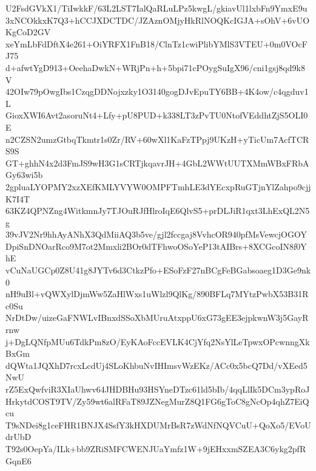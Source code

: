 U2FsdGVkX1/TiIwkkF/63L2LST7IalQaRLuLPz5kwgL/gkiavUl1lxbFn9YmxE9u
3xNCOkkxK7Q3+hCCJXDCTDC/JZAznOMjyHkRlNOQKcIGJA+sOhV+6vUOKgCoD2GV
xeYmLbFdDftX4e261+OiYRFX1FnB18/ClnTz1cwiPlibYMlS3VTEU+0m0VOcFJ75
d+afwtYgD913+OeehaDwkN+WRjPn+h+5bpi71cPOygSuIgX96/cni1gsj8qd9k8V
42OIw79pOwgIbs1CzqgDDNojxzky1O3140gogDJvEpuTY6BB+4K4ow/c4qgduv1L
GioxXWI6Avt2asoruNt4+Lfy+pU8PUD+k338LT3zPvTU0NtofVEddhtZjS5OLI0E
n2CZSN2umzGtbqTkmtr1s0Zr/RV+60wXl1KaFzTPpj9UKzH+yTicUm7AcfTCRS9S
GT+ghhN4x2d3FmJS9wH3G1sCRTjkqavrJH+4GbL2WWtUUTXMmWBxFRbAGy63wi5b
2gpluaLYOPMY2xzXEfKMLYVYW0OMPFTmhLE3dYEcxpRuGTjnYlZahpo9cjjK7I4T
63KZ4QPNZng4WitkmnJy7TJOuRJfHlroIqE6QlvS5+prDLJiR1qxt3LhExQL2N5g
39vJV2Nr9hhAyANhX3QdMiiAQ3b5ve/gjl2fccgaj8VvhcOR940pfMsVewcjOGOY
DpiSnDNOarRco9M7ot2Mmxli2BOr0dTFhwoOSoYeP13tAIBrs+8XCGcoIN8f0YhE
vCuNaUGCp0Z8U41g8JYTv6d3CtkzPfo+ESoFzF27nBCgFeBGabsoaeg1D3Ge9nk0
nH9uBl+vQWXylDjmWw5ZaHlWxs1uWlzl9QlKg/890BFLq7MYtzPwbX53B31Rc0Su
NrDtDw/uizeGaFNWLvIBnxdSSoXbMUruAtxppU6xG73gEE3ejpkwnW3j5GayRrnw
j+DgLQNfpMUu6TdkPm8zO/EyKAoFccEVLK4CjYfq2NsYlLeTpwxOPcwnngXkBxGm
dQWta1JQXhD7rcxLcdUj4SLoKhbuNvIHImsvWzEKz/ACc0x5bcQ7Dd/vXEed5NwU
rZ5ExQwfviR3XIaUhwv64JHDBHu93HSYneDTzc61ld5bIb/4qqLlIk5DCm3ypRoJ
HrkytdCOST9TV/Zy59wt6alRFaT89JZNegMurZ8Q1FG6gToC8gNcOp4qhZ7EiQcu
T9sNDei8g1ceFHR1BNJX4SsfY3kHXDUMrBsR7zWdNfNQVCuU+QoXo5/EVoUdrUbD
T92s0OepYa/ILk+bb9ZRiSMFCWENJUaYmfz1W+9jEHxxmSZEA3C6ykg2pfRGqnE6
